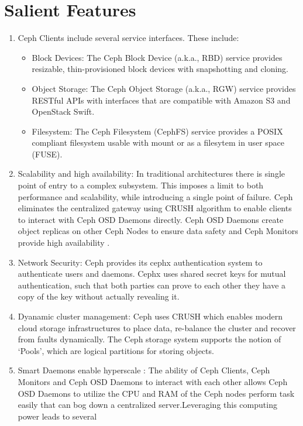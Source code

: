 \documentclass[9pt,twocolumn,twoside]{../../styles/osajnl}
\begin{document}
\section{Salient Features}
\begin{enumerate}
\item Ceph Clients include several service interfaces. These include:
\begin{itemize}
\item Block Devices: The Ceph Block Device (a.k.a., RBD) service
  provides resizable, thin-provisioned block devices with snapshotting
  and cloning.
\item Object Storage: The Ceph Object Storage (a.k.a., RGW) service
  provides RESTful APIs with interfaces that are compatible with
  Amazon S3 and OpenStack Swift.
\item Filesystem: The Ceph Filesystem (CephFS) service provides a
  POSIX compliant filesystem usable with mount or as a filesytem in
  user space (FUSE).
\end{itemize}
\item Scalability and high availability: In traditional architectures
  there is single point of entry to a complex subsystem. This imposes
  a limit to both performance and scalability, while introducing a
  single point of failure.  Ceph eliminates the centralized gateway
  using CRUSH algorithm to enable clients to interact with Ceph OSD
  Daemons directly. Ceph OSD Daemons create object replicas on other
  Ceph Nodes to ensure data safety and Ceph Monitors provide high
  availability \cite{www-ceph-scalable}.
\item Network Security: Ceph provides its cephx authentication system
  to authenticate users and daemons. Cephx uses shared secret keys for
  mutual authentication, such that both parties can prove to each
  other they have a copy of the key without actually revealing it.
\item Dyanamic cluster management: Ceph uses CRUSH which enables
  modern cloud storage infrastructures to place data, re-balance the
  cluster and recover from faults dynamically. The Ceph storage system
  supports the notion of ‘Pools’, which are logical partitions for
  storing objects.
\item Smart Daemons enable hyperscale \cite{www-ceph-daemon}: The
  ability of Ceph Clients, Ceph Monitors and Ceph OSD Daemons to
  interact with each other allows Ceph OSD Daemons to utilize the CPU
  and RAM of the Ceph nodes perform task easily that can bog down a
  centralized server.Leveraging this computing power leads to several

\end{enumerate}
\end{document}
